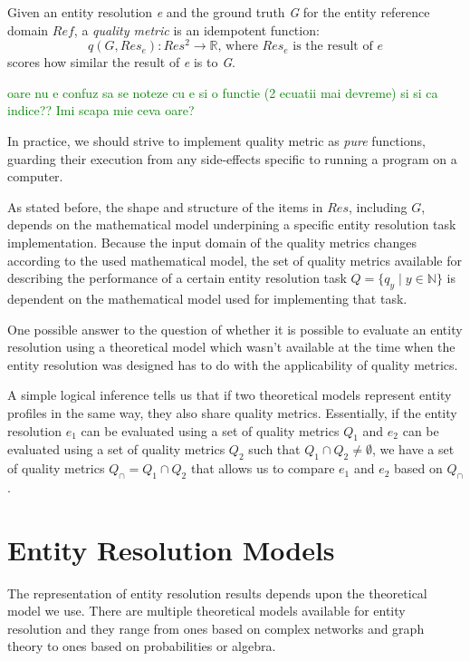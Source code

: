 \documentclass[journal]{IEEEtran}
\begin{document}
    \begin{defn}
    Given an entity resolution \textit{e} and the ground truth \textit{G} for
    the entity reference domain $Ref$, a \textit{quality metric} is an
    idempotent function:
    \[
        q(G, Res_e): Res^2 \rightarrow \mathbb{R}\textrm{, where
        }Res_e\textrm{ is the result of }e
    \]
    scores how similar the result of \textit{e} is to \textit{G}.
    \end{defn}
    \textcolor{green}{oare nu e confuz sa se noteze cu e si o functie (2 ecuatii mai devreme) si si ca indice?? Imi scapa mie ceva oare?}

    In practice, we should strive to implement quality metric as \textit{pure}
    functions, guarding their execution from any side-effects specific to
    running a program on a computer.

    As stated before, the shape and structure of the items in $Res$, including
    $G$, depends on the mathematical model underpining a specific entity
    resolution task implementation.
    Because the input domain of the quality metrics changes according to the
    used mathematical model, the set of quality metrics available for describing
    the performance of a certain entity resolution task $Q = \{q_y \mid y \in
    \mathbb{N}\}$ is dependent on the mathematical model used for implementing
    that task.

    One possible answer to the question of whether it is possible to evaluate
    an entity resolution using a theoretical model which wasn't available at the
    time when the entity resolution was designed has to do with the
    applicability of quality metrics.

    A simple logical inference tells us that if two theoretical models represent
    entity profiles in the same way, they also share quality metrics.
    Essentially, if the entity resolution $e_1$ can be evaluated using a set of
    quality metrics $Q_1$ and $e_2$ can be evaluated using a set of quality
    metrics $Q_2$ such that $Q_1 \cap Q_2 \neq \emptyset$, we have a set of
    quality metrics $Q_\cap = Q_1 \cap Q_2$ that allows us to compare $e_1$ and
    $e_2$ based on $Q_\cap$.
    
    \section[models]{Entity Resolution Models}\label{sec:models}

    The representation of entity resolution results depends upon the theoretical
    model we use.
    There are multiple theoretical models available for entity resolution and
    they range from ones based on complex networks and graph theory\cite{Li2020}
    to ones based on probabilities\cite{fs1969} or
    algebra\cite{Tal11,Ben2009Swoosh}.
\end{document}
